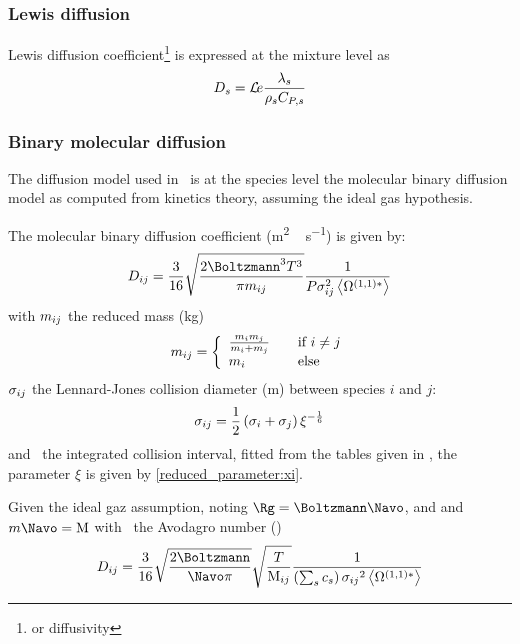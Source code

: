 \subsubsection{Lewis diffusion}

Lewis diffusion coefficient\footnote{or diffusivity} is expressed at
the mixture level as
\begin{equation}
\diff[s] = \Le \frac{\thermcond[s]}{\mass[s] \specificHeat[\Press,s]}
\label{diff:Lewis}
\end{equation}


\subsubsection{Binary molecular diffusion}

The diffusion model used in \Antioch\ is at the species
level the molecular binary diffusion model as computed from kinetics
theory, assuming the ideal gas hypothesis.

The molecular binary diffusion coefficient (\unit{m^2\,s^{-1}}) is given by:
\begin{equation}
\diff[ij] = \frac{3}{16} \sqrt{\frac{2\Boltzmann^3\Temp^3}{\pi\Mass_{ij}}}\frac{1}{\Press\LJdia_{ij}^2\Stockmayer{1}}
\label{bimol_diff:eq}
\end{equation}
with $\Mass_{ij}$ the reduced mass (\unit{kg})
\begin{equation}
\Mass_{ij} = \left\{\begin{array}{l@{\qquad}l}
                \frac{\Mass_i\Mass_j}{\Mass_i + \Mass_j} & \text{if } i \neq j \\
                \Mass_i                                  & \text{else}
                    \end{array}
              \right.
\label{diffusion:bimol:red_mass}
\end{equation}
$\LJdia_{ij}$ the Lennard-Jones collision diameter (\unit{m})
between species $i$ and $j$:
\begin{equation}
\LJdia_{ij} = \frac{1}{2}\left(\LJdia_i + \LJdia_j\right) \xi^{-\frac{1}{6}}
\label{diffusion:bimol:LJdia}
\end{equation}
and \ the integrated collision interval, fitted from
the tables given in \citet{Monchick1961}, the parameter $\xi$
is given by \ref{reduced_parameter:xi}.

Given the ideal gaz assumption, noting $\Rg = \Boltzmann\Navo$, and
and $\Mass\Navo = \Mm$ with
\Navo\ the Avodagro number (\NavoEquation)
\begin{equation}
\diff[ij] = \frac{3}{16}\sqrt{\frac{2\Boltzmann}{\Navo\pi}} 
                \sqrt{\frac{\Temp}{\Mm[ij]}}\frac{1}{\left(\sum_s\conc_s\right)\LJdia[ij]^2\Stockmayer{1}}
\label{diffusion:bimol:simplified}
\end{equation}

